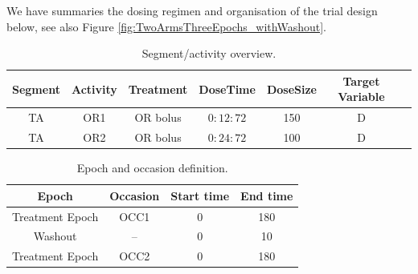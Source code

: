 We have summaries the dosing regimen and organisation of the trial
design below, see also Figure \ref{fig:TwoArmsThreeEpochs_withWashout}.

\begin{table}[htdp!]
\begin{center}
\renewcommand{\arraystretch}{1.1}%
\begin{tabular}{ccccccc}
\hline
Segment&Activity & Treatment & DoseTime & DoseSize & Target Variable \\
\hline
TA& OR1 &  OR bolus & $0:12:72$ & 150 & D \\
TA& OR2 &  OR bolus & $0:24:72$ & 100 & D \\
\hline
\end{tabular}
\end{center}
\caption{Segment/activity overview.}
\label{fig:eg4:segmentCellArmEpoch}
\end{table}

\begin{table}[htdp!]
\begin{center}
\renewcommand{\arraystretch}{1.1}%
\begin{tabular}{cccc}
\hline
Epoch & Occasion & Start time & End time \\
\hline
Treatment Epoch & OCC1 & 0 &  180  \\
Washout & -- & 0 &  10  \\
Treatment Epoch & OCC2 & 0 &  180  \\
\hline
\end{tabular}
\end{center}
\caption{Epoch and occasion definition.}
\label{fig:eg4:epochDef}
\end{table}


